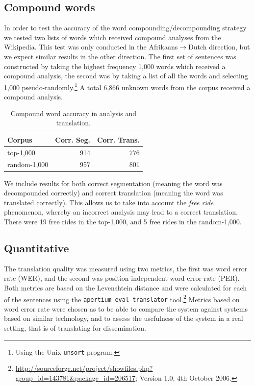\documentclass[11pt]{article}
\begin{document}
\subsection{Compound words}

In order to test the accuracy of the word compounding/decompounding strategy
we tested two lists of words which received compound analyses from 
the Wikipedia. This test was only conducted in the Afrikaans$\rightarrow$Dutch
direction, but we expect similar results in the other direction. The first
set of sentences was constructed by taking the highest frequency 1,000 words which received 
a compound analysis, the second was by taking a list of all the words and selecting
1,000 pseudo-randomly.\footnote{Using the Unix {\small {\tt unsort}} program.} A total 
6,866 unknown words from the corpus received a compound analysis.

\begin{table}
  \begin{center}
  \begin{tabular}{|l|r|r|}
   \hline
   {\bf Corpus}    & {\bf Corr. Seg.}    & {\bf Corr. Trans.}\\
   \hline
   top-1,000       & 914                 &  776 \\ 
   \hline
   random-1,000    & 957                 &  801 \\ 
   \hline
  \end{tabular}
    \caption{Compound word accuracy in analysis and translation.}
    \label{table:compounds}
  \end{center}
\end{table}

We include results for both correct segmentation (meaning the word was decompounded 
correctly) and correct translation (meaning the word was translated correctly). This allows
us to take into account the {\em free ride} phenomenon, whereby an incorrect analysis
may lead to a correct translation. There were 19 free rides in the top-1,000, and 5 free 
rides in the random-1,000.

\subsection{Quantitative}

The translation quality was measured using two metrics, the first was word error rate (WER), and the 
second was position-independent word error rate (PER). Both metrics are based on the Levenshtein 
distance \cite{Levenshtein:65} and were calculated for each of the sentences using the 
{\small \texttt{apertium-eval-translator}} tool.\footnote{\url{http://sourceforge.net/project/showfiles.php?group_id=143781&package_id=206517}; Version 1.0, 4th October 2006.} Metrics based on word error rate were chosen as to be able to compare 
the system against systems based on similar technology, and to assess the usefulness of the 
system in a real setting, that is of translating for dissemination. 
\end{document}
